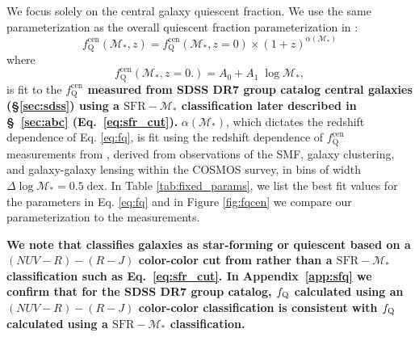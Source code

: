 \documentclass[iop,apj,tighten,twocolappendix,numberedappendix]{emulateapj}
\newcommand{\todo}[1]{{\bf \textcolor{red}{ #1}}}
\newcommand{\beq}{\begin{equation}}
\newcommand{\eeq}{\end{equation}}
\newcommand{\fqcen}{f_\mathrm{Q}^\mathrm{cen}}
\begin{document}
We focus solely on the central galaxy quiescent fraction. We use the same 
parameterization as the overall quiescent fraction parameterization in \cite{Wetzel:2013aa}: 
\beq \label{eq:fq}
f_\mathrm{Q}^\mathrm{cen}(\mathcal{M}_*, z) = f_\mathrm{Q}^\mathrm{cen}(\mathcal{M}_*, z=0) 
\times (1+z)^{\alpha(\mathcal{M}_*)}
\eeq
where 
\beq \label{eq:fqz0}
f_\mathrm{Q}^\mathrm{cen}(\mathcal{M}_*, z=0.) = A_0 + A_1\; \log\mathcal{M}_*,
\eeq
is fit to the 
{\bf \color{dred}
$\fqcen$ measured from SDSS DR7 group catalog central galaxies (\S \ref{sec:sdss}) 
using a $\mathrm{SFR}-\mathcal{M}_*$ classification later described in 
\S~\ref{sec:abc} (Eq.~\ref{eq:sfr_cut}).
}
$\alpha(\mathcal{M}_*)$, which dictates
the redshift dependence of Eq. \ref{eq:fq}, is fit using the 
redshift dependence of $\fqcen$ measurements from \cite{Tinker:2013aa}, 
derived from observations of the SMF, galaxy clustering, and galaxy-galaxy
lensing within the COSMOS survey,
in bins of width $\Delta \log\mathcal{M}_* = 0.5\;\mathrm{dex}$. 
In Table \ref{tab:fixed_params}, we list the best fit values for 
the parameters in Eq. \ref{eq:fq} and in Figure \ref{fig:fqcen} 
we compare our parameterization to the \cite{Tinker:2013aa} 
measurements. 

{\bf \color{dred}
We note that \cite{Tinker:2013aa} classifies galaxies as star-forming 
or quiescent based on a $(NUV-R) - (R-J)$ color-color cut from 
\cite{Bundy:2010aa} rather than a $\mathrm{SFR}-\mathcal{M}_*$ 
classification such as Eq.~\ref{eq:sfr_cut}. In Appendix~\ref{app:sfq}
we confirm that for the SDSS DR7 group catalog, $f_{\rm Q}$ calculated 
using an $(NUV-R) - (R-J)$ color-color classification is consistent 
with $f_{\rm Q}$ calculated using a $\mathrm{SFR}-\mathcal{M}_*$
classification. 
}

\end{document}
